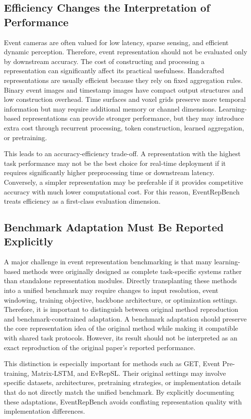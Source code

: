 \documentclass[letterpaper]{article}
\begin{document}
\subsection{Efficiency Changes the Interpretation of Performance}
Event cameras are often valued for low latency, sparse sensing, and efficient dynamic perception. Therefore, event representation should not be evaluated only by downstream accuracy. The cost of constructing and processing a representation can significantly affect its practical usefulness. Handcrafted representations are usually efficient because they rely on fixed aggregation rules. Binary event images and timestamp images have compact output structures and low construction overhead. Time surfaces and voxel grids preserve more temporal information but may require additional memory or channel dimensions. Learning-based representations can provide stronger performance, but they may introduce extra cost through recurrent processing, token construction, learned aggregation, or pretraining.

This leads to an accuracy-efficiency trade-off. A representation with the highest task performance may not be the best choice for real-time deployment if it requires significantly higher preprocessing time or downstream latency. Conversely, a simpler representation may be preferable if it provides competitive accuracy with much lower computational cost. For this reason, EventRepBench treats efficiency as a first-class evaluation dimension.

\subsection{Benchmark Adaptation Must Be Reported Explicitly}
A major challenge in event representation benchmarking is that many learning-based methods were originally designed as complete task-specific systems rather than standalone representation modules. Directly transplanting these methods into a unified benchmark may require changes to input resolution, event windowing, training objective, backbone architecture, or optimization settings. Therefore, it is important to distinguish between original method reproduction and benchmark-constrained adaptation. A benchmark adaptation should preserve the core representation idea of the original method while making it compatible with shared task protocols. However, its result should not be interpreted as an exact reproduction of the original paper's reported performance.

This distinction is especially important for methods such as GET, Event Pre-training, Matrix-LSTM, and EvRepSL. Their original settings may involve specific datasets, architectures, pretraining strategies, or implementation details that do not directly match the unified benchmark. By explicitly documenting these adaptations, EventRepBench avoids conflating representation quality with implementation differences.
\end{document}
